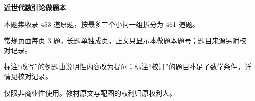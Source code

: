 \documentclass[UTF8,a4paper,12pt,fontset=fandol]{ctexart}
\begin{document}
\thispagestyle{empty}
\begin{center}{\LARGE\bfseries 近世代数引论做题本}\par\vspace{6mm}{\large 完整题集}\end{center}
本题集收录 453 道原题，按最多三个小问一组拆分为 461 道题。

常规页面每页 3 题，长题单独成页。正文只显示本做题本题号；题目来源另附校对记录。

标注“改写”的例题由说明性内容改为提问；标注“校订”的题目补足了数学条件，详情见校对记录。

仅限非商业性使用。教材原文与配图的权利归原权利人。
\tableofcontents\clearpage
\clearpage
\clearpage
\clearpage
\end{document}
